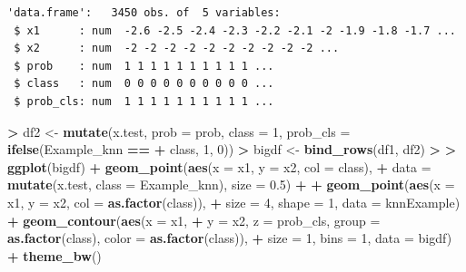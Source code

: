 \documentclass[]{krantz}
\makeatletter
\newenvironment{Shaded}{\begin{snugshade}}{\end{snugshade}}
\newcommand{\DataTypeTok}[1]{\textcolor[rgb]{0.27,0.27,0.27}{#1}}
\newcommand{\DecValTok}[1]{\textcolor[rgb]{0.06,0.06,0.06}{#1}}
\newcommand{\ErrorTok}[1]{\textcolor[rgb]{0.14,0.14,0.14}{\textbf{#1}}}
\newcommand{\FloatTok}[1]{\textcolor[rgb]{0.06,0.06,0.06}{#1}}
\newcommand{\KeywordTok}[1]{\textcolor[rgb]{0.27,0.27,0.27}{\textbf{#1}}}
\newcommand{\NormalTok}[1]{#1}
\newcommand{\OperatorTok}[1]{\textcolor[rgb]{0.43,0.43,0.43}{\textbf{#1}}}
\newcommand{\StringTok}[1]{\textcolor[rgb]{0.5,0.5,0.5}{#1}}
\newenvironment{kframe}{%
\medskip{}
\setlength{\fboxsep}{.8em}
 \def\at@end@of@kframe{}%
 \ifinner\ifhmode%
  \def\at@end@of@kframe{\end{minipage}}%
  \begin{minipage}{\columnwidth}%
 \fi\fi%
 \def\FrameCommand##1{\hskip\@totalleftmargin \hskip-\fboxsep
 \colorbox{shadecolor}{##1}\hskip-\fboxsep
     \hskip-\linewidth \hskip-\@totalleftmargin \hskip\columnwidth}%
 \MakeFramed {\advance\hsize-\width
   \@totalleftmargin\z@ \linewidth\hsize
   \@setminipage}}%
 {\par\unskip\endMakeFramed%
 \at@end@of@kframe}
\renewenvironment{Shaded}{\begin{kframe}}{\end{kframe}}
\makeatother
\begin{document}
\begin{verbatim}
'data.frame':   3450 obs. of  5 variables:
 $ x1      : num  -2.6 -2.5 -2.4 -2.3 -2.2 -2.1 -2 -1.9 -1.8 -1.7 ...
 $ x2      : num  -2 -2 -2 -2 -2 -2 -2 -2 -2 -2 ...
 $ prob    : num  1 1 1 1 1 1 1 1 1 1 ...
 $ class   : num  0 0 0 0 0 0 0 0 0 0 ...
 $ prob_cls: num  1 1 1 1 1 1 1 1 1 1 ...
\end{verbatim}

\begin{Shaded}
\begin{Highlighting}[]
\OperatorTok{>}\StringTok{ }\NormalTok{df2 <-}\StringTok{ }\KeywordTok{mutate}\NormalTok{(x.test, }\DataTypeTok{prob =}\NormalTok{ prob, }\DataTypeTok{class =} \DecValTok{1}\NormalTok{, }\DataTypeTok{prob_cls =} \KeywordTok{ifelse}\NormalTok{(Example_knn }\OperatorTok{==}\StringTok{ }
\OperatorTok{+}\StringTok{   }\NormalTok{class, }\DecValTok{1}\NormalTok{, }\DecValTok{0}\NormalTok{))}
\OperatorTok{>}\StringTok{ }\NormalTok{bigdf <-}\StringTok{ }\KeywordTok{bind_rows}\NormalTok{(df1, df2)}
\OperatorTok{>}\StringTok{ }
\ErrorTok{>}\StringTok{ }\KeywordTok{ggplot}\NormalTok{(bigdf) }\OperatorTok{+}\StringTok{ }\KeywordTok{geom_point}\NormalTok{(}\KeywordTok{aes}\NormalTok{(}\DataTypeTok{x =}\NormalTok{ x1, }\DataTypeTok{y =}\NormalTok{ x2, }\DataTypeTok{col =}\NormalTok{ class), }
\OperatorTok{+}\StringTok{   }\DataTypeTok{data =} \KeywordTok{mutate}\NormalTok{(x.test, }\DataTypeTok{class =}\NormalTok{ Example_knn), }\DataTypeTok{size =} \FloatTok{0.5}\NormalTok{) }\OperatorTok{+}\StringTok{ }
\OperatorTok{+}\StringTok{   }\KeywordTok{geom_point}\NormalTok{(}\KeywordTok{aes}\NormalTok{(}\DataTypeTok{x =}\NormalTok{ x1, }\DataTypeTok{y =}\NormalTok{ x2, }\DataTypeTok{col =} \KeywordTok{as.factor}\NormalTok{(class)), }
\OperatorTok{+}\StringTok{     }\DataTypeTok{size =} \DecValTok{4}\NormalTok{, }\DataTypeTok{shape =} \DecValTok{1}\NormalTok{, }\DataTypeTok{data =}\NormalTok{ knnExample) }\OperatorTok{+}\StringTok{ }\KeywordTok{geom_contour}\NormalTok{(}\KeywordTok{aes}\NormalTok{(}\DataTypeTok{x =}\NormalTok{ x1, }
\OperatorTok{+}\StringTok{   }\DataTypeTok{y =}\NormalTok{ x2, }\DataTypeTok{z =}\NormalTok{ prob_cls, }\DataTypeTok{group =} \KeywordTok{as.factor}\NormalTok{(class), }\DataTypeTok{color =} \KeywordTok{as.factor}\NormalTok{(class)), }
\OperatorTok{+}\StringTok{   }\DataTypeTok{size =} \DecValTok{1}\NormalTok{, }\DataTypeTok{bins =} \DecValTok{1}\NormalTok{, }\DataTypeTok{data =}\NormalTok{ bigdf) }\OperatorTok{+}\StringTok{ }\KeywordTok{theme_bw}\NormalTok{()}
\end{Highlighting}
\end{Shaded}
\end{document}
